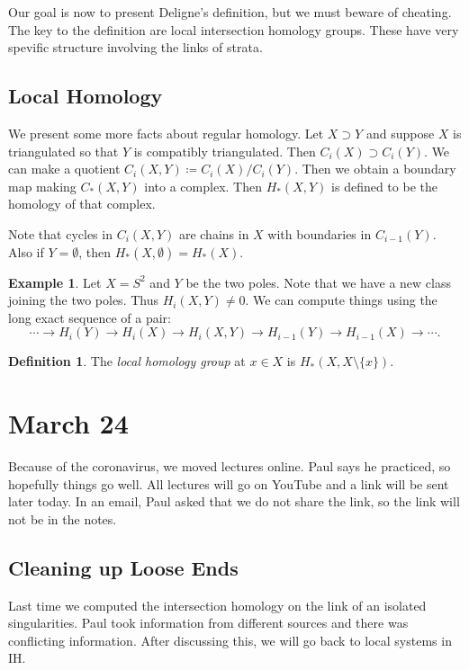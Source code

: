 \documentclass[leqno, openany]{memoir}
\theoremstyle{definition}
\newtheorem{defn}[thm]{Definition}
\newtheorem{exm}[thm]{Example}
\theoremstyle{remark}
\theoremstyle{plain}
\theoremstyle{definition}
\theoremstyle{remark}
\begin{document}
Our goal is now to present Deligne's definition, but we must beware of
cheating. The key to the definition are local intersection homology groups.
These have very spevific structure involving the links of strata.

\section{Local Homology}%

We present some more facts about regular homology. Let $X \supset Y$ and
suppose $X$ is triangulated so that $Y$ is compatibly triangulated. Then
$C_i(X) \supset C_i(Y)$. We can make a quotient $C_i(X,Y) \coloneqq C_i(X) /
C_i(Y)$. Then we obtain a boundary map making $C_*(X,Y)$ into a complex. Then
$H_*(X,Y)$ is defined to be the homology of that complex.

Note that cycles in $C_i(X,Y)$ are chains in $X$ with boundaries in
$C_{i-1}(Y)$. Also if $Y = \emptyset$, then $H_*(X, \emptyset) = H_*(X)$.

\begin{exm} Let $X = S^2$ and $Y$ be the two poles. Note that we have a new
    class joining the two poles. Thus $H_i(X,Y) \neq 0$. We can compute things
    using the long exact sequence of a pair: \[ \cdots \to H_i(Y) \to H_i(X)
    \to H_i(X,Y) \to H_{i-1}(Y) \to H_{i-1}(X) \to \cdots. \] \end{exm}

\begin{defn} The \textit{local homology group} at $x \in X$ is $H_*(X, X
\setminus \{x\})$.  \end{defn}

\chapter{March 24}%

Because of the coronavirus, we moved lectures online. Paul says he practiced,
so hopefully things go well. All lectures will go on YouTube and a link will be
sent later today. In an email, Paul asked that we do not share the link, so the
link will not be in the notes.

\section{Cleaning up Loose Ends}%

Last time we computed the intersection homology on the link of an isolated
singularities. Paul took information from different sources and there was
conflicting information. After discussing this, we will go back to local
systems in IH.
\end{document}
